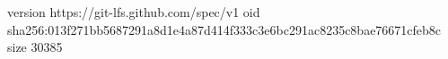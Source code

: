 version https://git-lfs.github.com/spec/v1
oid sha256:013f271bb5687291a8d1e4a87d414f333c3e6bc291ac8235c8bae76671cfeb8c
size 30385
